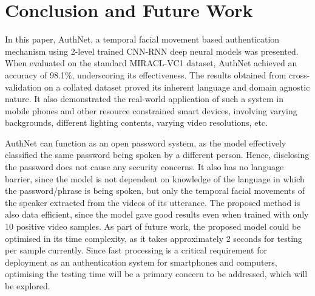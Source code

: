 \documentclass[letterpaper]{article}
\begin{document}
\section{Conclusion and Future Work}
In this paper, AuthNet, a temporal facial movement based authentication mechanism using 2-level trained CNN-RNN deep neural models was presented. When evaluated on the standard MIRACL-VC1 dataset, AuthNet achieved an accuracy of 98.1\%, underscoring its effectiveness. The results obtained from cross-validation on a collated dataset proved its inherent language and domain agnostic nature. It also demonstrated the real-world application of such a system in mobile phones and other resource constrained smart devices, involving varying backgrounds, different lighting contents, varying video resolutions, etc. 

AuthNet can function as an open password system, as the model effectively classified the same password being spoken by a different person. Hence, disclosing the password does not cause any security concerns. It also has no language barrier, since the model is not dependent on knowledge of the language in which the password/phrase is being spoken, but only the temporal facial movements of the speaker extracted from the videos of its utterance. The proposed method is also data efficient, since the model gave good results even when trained with only 10 positive video samples. As part of future work, the proposed model could be optimised in its time complexity, as it takes approximately 2 seconds for testing per sample currently. Since fast processing is a critical requirement for deployment as an authentication system for smartphones and computers, optimising the testing time will be a primary concern to be addressed, which will be explored.


\end{document}
